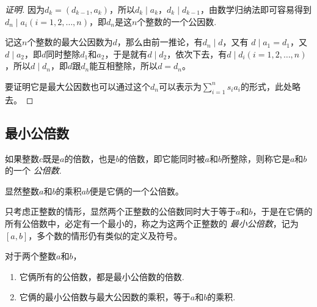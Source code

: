 \begin{proof}[证明]
  因为$d_k=(d_{k-1},a_k)$，所以$d_k \mid a_k$，$d_k \mid d_{k-1}$，由数学归纳法即可容易得到$d_n \mid a_i(i=1,2,\dots,n)$，即$d_n$是这$n$个整数的一个公因数.

  记这$n$个整数的最大公因数为$d$，那么由前一推论，有$d_n \mid d$，又有 $d \mid a_1=d_1$，又$d \mid a_2$，即$d$同时整除$d_1$和$a_2$，于是就有$d \mid d_2$，依次下去，有$d \mid d_i(i=1,2,\ldots,n)$，所以$d \mid d_n$，即$d$跟$d_n$能互相整除，所以$d=d_n$。

  要证明它是最大公因数也可以通过这个$d_n$可以表示为$\sum_{i=1}^n s_ia_i$的形式，此处略去。
\end{proof}

\subsection{最小公倍数}
\label{sec:least-common-multiple}

\begin{definition}
  如果整数$c$既是$a$的倍数，也是$b$的倍数，即它能同时被$a$和$b$所整除，则称它是$a$和$b$的一个 \emph{公倍数}.
\end{definition}
显然整数$a$和$b$的乘积$ab$便是它俩的一个公倍数。

只考虑正整数的情形，显然两个正整数的公倍数同时大于等于$a$和$b$，于是在它俩的所有公倍数中，必定有一个最小的，称之为这两个正整数的 \emph{最小公倍数}，记为$[a,b]$，多个数的情形仍有类似的定义及符号。

\begin{theorem}
  对于两个整数$a$和$b$，
  \begin{enumerate}
  \item 它俩所有的公倍数，都是最小公倍数的倍数.
  \item 它俩的最小公倍数与最大公因数的乘积，等于$a$和$b$的乘积.
  \end{enumerate}
\end{theorem}

